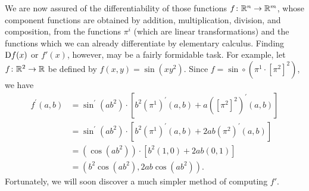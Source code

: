 We are now assured of the differentiability of those functions
$f\colon{}\mathbb{R}^n \to \mathbb{R}^m$, whose component functions are obtained by
addition, multiplication, division, and composition, from the
functions $\pi^i$ (which are linear transformations) and the functions 
which we can already differentiate by elementary calculus.
Finding $\mathrm{D}f(x)$ or $f'(x)$, however, may be a fairly
formidable task. For example, let $f\colon{}\mathbb{R}^2 \to \mathbb{R}$ be defined by 
$f(x, y) = \sin(xy^2)$. Since $f=\sin\circ \left(\pi^1\cdot \left[\pi^2\right]^2\right)$,
we have 
\begin{align*}
    f^{\prime}(a{,}b)
    & = \sin^{\prime}(ab^{2})\cdot[b^{2}(\pi^{1})^{\prime}(a,b)+a([\pi^{2}]^{2})^{\prime}(a,b)]  \\
    & = \sin^{\prime}(ab^{2})\cdot[b^{2}(\pi^{1})^{\prime}(a,b)+2ab(\pi^{2})^{\prime}(a,b)] \\
    & = (\cos(ab^{2}))\cdot[b^{2}(1,0)+2ab(0,1)] \\
    & = (b^{2}\cos(ab^{2}),2ab\cos(ab^{2})).
\end{align*}
Fortunately, we will soon discover a much simpler method of computing $f'$.

